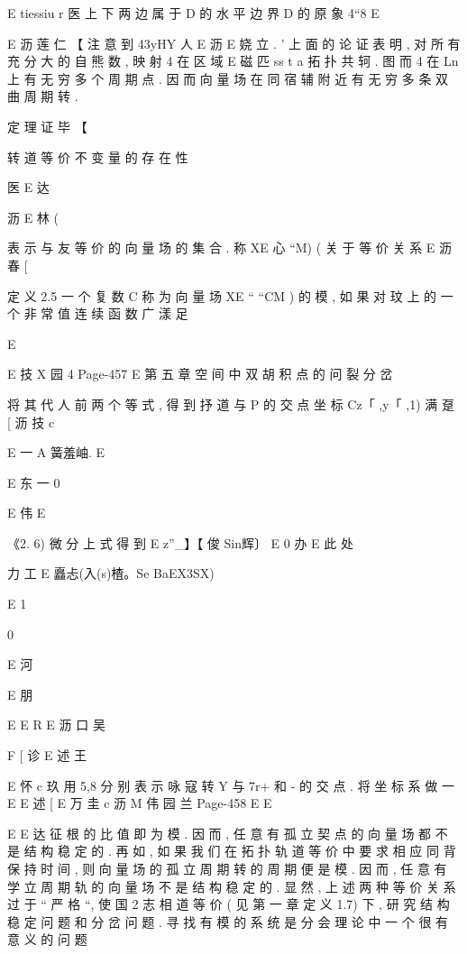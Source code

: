 {{{{{E tiessiu r
医
上 下 两 边 属 于 D 的 水 平 边 界 D 的 原 象 4“8%
E

E 沥 莲 仁 【
注 意 到 43yHY 人 %
E 沥
E
娆 立 . '
上 面 的 论 证 表 明 , 对 所 有 充 分 大 的 自 熊 数 , 映 射 4 在 区 域
E 磁 匹 ss t a
拓 扑 共 轲 . 图 而 4 在 Ln 上 有 无 穷 多 个 周 期 点 . 因 而 向 量 场 在 同 宿
辅 附 近 有 无 穷 多 条 双 曲 周 期 转 .

定 理 证 毕 【

转 道 等 价 不 变 量 的 存 在 性

医
E 达

沥
E 林 (

表 示 与 友 等 价 的 向 量 场 的 集 合 . 称 XE 心 “M) ( 关 于 等 价 关 系
E 沥 春 [

定 义 2.5 一 个 复 数 C 称 为 向 量 场 XE “ “CM ) 的 模 , 如 果 对
玟
上 的 一 个 非 常 值 连 续 函 数 广 漾 足

E

E 技 X 园 4
Page-457
E 第 五 章 空 间 中 双 胡 积 点 的 问 裂 分 岔

将 其 代 人 前 两 个 等 式 , 得 到 抒 道 与 P 的 交 点 坐 标 Cz「 ,y「 ,1) 满 趸
[ 沥 技 c

E 一 A 簧羞岫. E

E 东 一
0

E 伟 E

《2. 6)
微 分 上 式 得 到
E z”_】【 俊 Sin辉〕 E 0 办
E
此 处

力 工 E 矗忐(入(s)楂。Se BaEX3SX)

E 1

0

E 河

E 朋

E
E R E 沥 口 吴

F
[ 诊
E 述 王

E 怀 c 玖
用 5,8 分 别 表 示 咏 寇 转 Y 与 7r+ 和 - 的 交 点 . 将 坐 标 系 做 一
E
E 述 [
E 万 圭 c 沥
M 伟
园 兰
Page-458
E E

E
E 达
征 根 的 比 值 即 为 模 . 因 而 , 任 意 有 孤 立 契 点 的 向 量 场 都 不 是 结 构 稳
定 的 . 再 如 , 如 果 我 们 在 拓 扑 轨 道 等 价 中 要 求 相 应 同 背 保 持 时 间 ,
则 向 量 场 的 孤 立 周 期 转 的 周 期 便 是 模 . 因 而 , 任 意 有 学 立 周 期 轨 的
向 量 场 不 是 结 构 稳 定 的 . 显 然 , 上 述 两 种 等 价 关 系 过 于 “ 严 格 “, 使
国 2 志 相
道 等 价 ( 见 第 一 章 定 义 1.7) 下 , 研 究 结 构 稳 定 问 题 和 分 岔 问 题 . 寻
找 有 模 的 系 统 是 分 会 理 论 中 一 个 很 有 意 义 的 问 题

}}}}}
